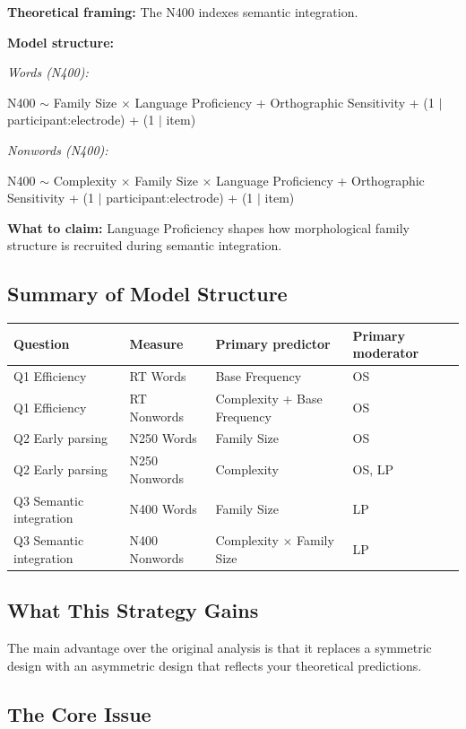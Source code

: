 \documentclass[12pt]{article}
\begin{document}
	\textbf{Theoretical framing:} The N400 indexes semantic integration.
	
	\textbf{Model structure:}
	
	\textit{Words (N400):}
	
	N400 $\sim$ Family Size $\times$ Language Proficiency + Orthographic Sensitivity + (1 $|$ participant:electrode) + (1 $|$ item)
	
	\textit{Nonwords (N400):}
	
	N400 $\sim$ Complexity $\times$ Family Size $\times$ Language Proficiency + Orthographic Sensitivity + (1 $|$ participant:electrode) + (1 $|$ item)
	
	\textbf{What to claim:} Language Proficiency shapes how morphological family structure is recruited during semantic integration.
	
	\subsection{Summary of Model Structure}
	
	\begin{center}
		\begin{tabular}{llll}
			\hline
			Question & Measure & Primary predictor & Primary moderator \\
			\hline
			Q1 Efficiency & RT Words & Base Frequency & OS \\
			Q1 Efficiency & RT Nonwords & Complexity + Base Frequency & OS \\
			Q2 Early parsing & N250 Words & Family Size & OS \\
			Q2 Early parsing & N250 Nonwords & Complexity & OS, LP \\
			Q3 Semantic integration & N400 Words & Family Size & LP \\
			Q3 Semantic integration & N400 Nonwords & Complexity $\times$ Family Size & LP \\
			\hline
		\end{tabular}
	\end{center}
	
	\subsection{What This Strategy Gains}
	
	The main advantage over the original analysis is that it replaces a symmetric design with an asymmetric design that reflects your theoretical predictions.
	
	\subsection{The Core Issue}
	
\end{document}
